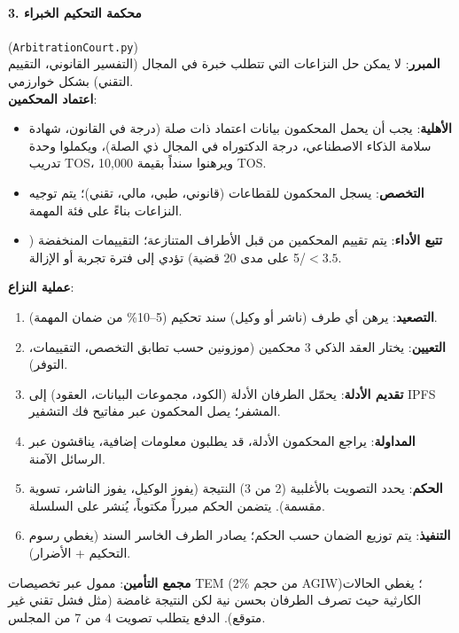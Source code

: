 \documentclass[11pt]{article}
\begin{document}
\paragraph{3. محكمة التحكيم الخبراء} (\texttt{ArbitrationCourt.py})\\
\textbf{المبرر}: لا يمكن حل النزاعات التي تتطلب خبرة في المجال (التفسير القانوني، التقييم التقني) بشكل خوارزمي.\\
\textbf{اعتماد المحكمين}:
\begin{itemize}[noitemsep]
  \item \textbf{الأهلية}: يجب أن يحمل المحكمون بيانات اعتماد ذات صلة (درجة في القانون، شهادة سلامة الذكاء الاصطناعي، درجة الدكتوراه في المجال ذي الصلة)، ويكملوا وحدة تدريب TOS، ويرهنوا سنداً بقيمة 10,000 TOS.
  \item \textbf{التخصص}: يسجل المحكمون للقطاعات (قانوني، طبي، مالي، تقني)؛ يتم توجيه النزاعات بناءً على فئة المهمة.
  \item \textbf{تتبع الأداء}: يتم تقييم المحكمين من قبل الأطراف المتنازعة؛ التقييمات المنخفضة ($<3.5$/5 على مدى 20 قضية) تؤدي إلى فترة تجربة أو الإزالة.
\end{itemize}
\textbf{عملية النزاع}:
\begin{enumerate}[noitemsep]
  \item \textbf{التصعيد}: يرهن أي طرف (ناشر أو وكيل) سند تحكيم (5--10\% من ضمان المهمة).
  \item \textbf{التعيين}: يختار العقد الذكي 3 محكمين (موزونين حسب تطابق التخصص، التقييمات، التوفر).
  \item \textbf{تقديم الأدلة}: يحمّل الطرفان الأدلة (الكود، مجموعات البيانات، العقود) إلى IPFS المشفر؛ يصل المحكمون عبر مفاتيح فك التشفير.
  \item \textbf{المداولة}: يراجع المحكمون الأدلة، قد يطلبون معلومات إضافية، يناقشون عبر الرسائل الآمنة.
  \item \textbf{الحكم}: يحدد التصويت بالأغلبية (2 من 3) النتيجة (يفوز الوكيل، يفوز الناشر، تسوية مقسمة). يتضمن الحكم مبرراً مكتوباً، يُنشر على السلسلة.
  \item \textbf{التنفيذ}: يتم توزيع الضمان حسب الحكم؛ يصادر الطرف الخاسر السند (يغطي رسوم التحكيم + الأضرار).
\end{enumerate}
\textbf{مجمع التأمين}: ممول عبر تخصيصات TEM (2\% من حجم AGIW)؛ يغطي الحالات الكارثية حيث تصرف الطرفان بحسن نية لكن النتيجة غامضة (مثل فشل تقني غير متوقع). الدفع يتطلب تصويت 4 من 7 من المجلس.
\end{document}
